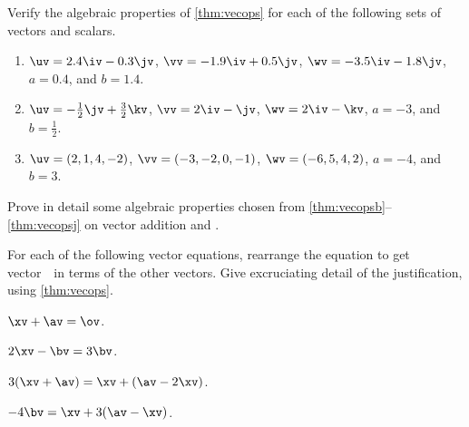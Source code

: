 \begin{exercise}  
Verify the algebraic properties of \cref{thm:vecops} for each of the following sets of vectors and scalars.
\begin{enumerate}
\item \(\uv=2.4\iv-0.3\jv\), \(\vv=-1.9\iv+0.5\jv\), \(\wv=-3.5\iv-1.8\jv\), \(a=0.4\), and \(b=1.4\).
\item \(\uv=-\frac12\jv+\frac32\kv\), \(\vv=2\iv-\jv\), \(\wv=2\iv-\kv\), \(a=-3\), and \(b=\frac12\).
\item \(\uv=(2,1,4,-2)\), \(\vv=(-3,-2,0,-1)\), \(\wv=(-6,5,4,2)\), \(a=-4\), and \(b=3\).
\end{enumerate}
\end{exercise}




\begin{exercise}  
Prove in detail some algebraic properties chosen from \cref{thm:vecopsb}--\ref{thm:vecopsj} on vector addition and .
\end{exercise}




\begin{exercise}  
For each of the following vector equations, rearrange the equation to get vector~\xv\ in terms of the other vectors.  Give excruciating detail of the justification, using \cref{thm:vecops}.
\begin{Parts}
\item \(\xv+\av=\ov\).
\item \(2\xv-\bv=3\bv\).
\item \(3(\xv+\av)=\xv+(\av-2\xv)\).
\item \(-4\bv=\xv+3(\av-\xv)\).
\end{Parts}
\end{exercise}




